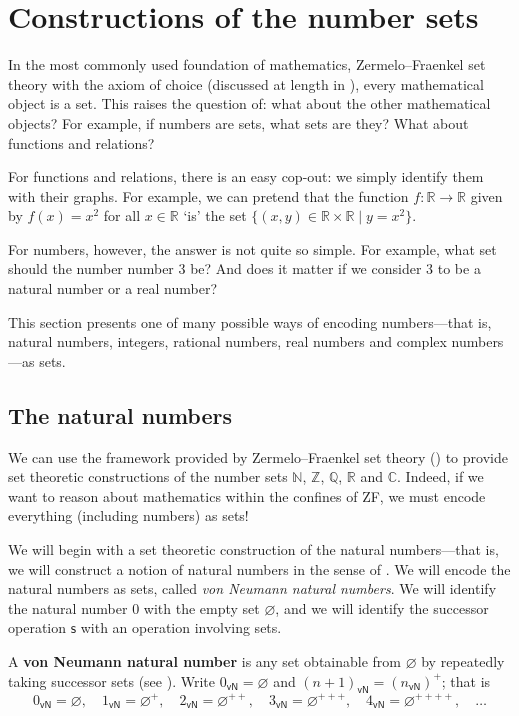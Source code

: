 \section{Constructions of the number sets}

In the most commonly used foundation of mathematics, Zermelo--Fraenkel set theory with the axiom of choice (discussed at length in ), every mathematical object is a set. This raises the question of: what about the other mathematical objects? For example, if numbers are sets, what sets are they? What about functions and relations?

For functions and relations, there is an easy cop-out: we simply identify them with their graphs. For example, we can pretend that the function $f : \mathbb{R} \to \mathbb{R}$ given by $f(x) = x^2$ for all $x \in \mathbb{R}$ `is' the set $\{ (x,y) \in \mathbb{R} \times \mathbb{R} \mid y = x^2 \}$.

For numbers, however, the answer is not quite so simple. For example, what set should the number number $3$ be? And does it matter if we consider $3$ to be a natural number or a real number?

This section presents one of many possible ways of encoding numbers---that is, natural numbers, integers, rational numbers, real numbers and complex numbers---as sets.

\subsection*{The natural numbers}

We can use the framework provided by Zermelo--Fraenkel set theory () to provide set theoretic constructions of the number sets $\mathbb{N}$, $\mathbb{Z}$, $\mathbb{Q}$, $\mathbb{R}$ and $\mathbb{C}$. Indeed, if we want to reason about mathematics within the confines of ZF, we must encode everything (including numbers) as sets!

We will begin with a set theoretic construction of the natural numbers---that is, we will construct a notion of natural numbers in the sense of . We will encode the natural numbers as sets, called \textit{von Neumann natural numbers}. We will identify the natural number $0$ with the empty set $\varnothing$, and we will identify the successor operation $\mathsf{s}$ with an operation involving sets.

\begin{definition}
\label{defVonNeumannNaturalNumbers}
A \textbf{von Neumann natural number} is any set obtainable from $\varnothing$ by repeatedly taking successor sets (see ). Write $0_{\mathsf{vN}} = \varnothing$ and $(n+1)_{\mathsf{vN}} = (n_{\mathsf{vN}})^+$; that is
\[ 0_{\mathsf{vN}} = \varnothing, \quad 1_{\mathsf{vN}} = \varnothing^+, \quad 2_{\mathsf{vN}} = \varnothing^{++}, \quad 3_{\mathsf{vN}} = \varnothing^{+++}, \quad 4_{\mathsf{vN}} = \varnothing^{++++}, \quad \dots \]
\end{definition}


